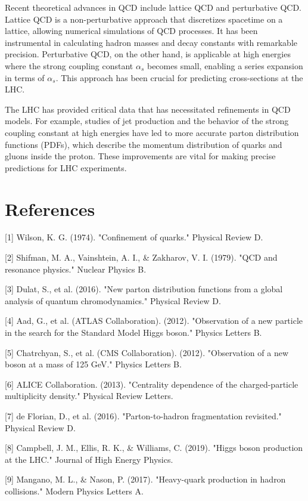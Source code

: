 \documentclass{article}
\begin{document}
Recent theoretical advances in QCD include lattice QCD and perturbative QCD. Lattice QCD is a non-perturbative approach that discretizes spacetime on a lattice, allowing numerical simulations of QCD processes. It has been instrumental in calculating hadron masses and decay constants with remarkable precision. Perturbative QCD, on the other hand, is applicable at high energies where the strong coupling constant $\alpha_s$ becomes small, enabling a series expansion in terms of $\alpha_s$. This approach has been crucial for predicting cross-sections at the LHC.

The LHC has provided critical data that has necessitated refinements in QCD models. For example, studies of jet production and the behavior of the strong coupling constant at high energies have led to more accurate parton distribution functions (PDFs), which describe the momentum distribution of quarks and gluons inside the proton. These improvements are vital for making precise predictions for LHC experiments.

\section*{References}
[1] Wilson, K. G. (1974). "Confinement of quarks." Physical Review D.

[2] Shifman, M. A., Vainshtein, A. I., \& Zakharov, V. I. (1979). "QCD and resonance physics." Nuclear Physics B.

[3] Dulat, S., et al. (2016). "New parton distribution functions from a global analysis of quantum chromodynamics." Physical Review D.

[4] Aad, G., et al. (ATLAS Collaboration). (2012). "Observation of a new particle in the search for the Standard Model Higgs boson." Physics Letters B.

[5] Chatrchyan, S., et al. (CMS Collaboration). (2012). "Observation of a new boson at a mass of 125 GeV." Physics Letters B.

[6] ALICE Collaboration. (2013). "Centrality dependence of the charged-particle multiplicity density." Physical Review Letters.

[7] de Florian, D., et al. (2016). "Parton-to-hadron fragmentation revisited." Physical Review D.

[8] Campbell, J. M., Ellis, R. K., \& Williams, C. (2019). "Higgs boson production at the LHC." Journal of High Energy Physics.

[9] Mangano, M. L., \& Nason, P. (2017). "Heavy-quark production in hadron collisions." Modern Physics Letters A.
\end{document}
